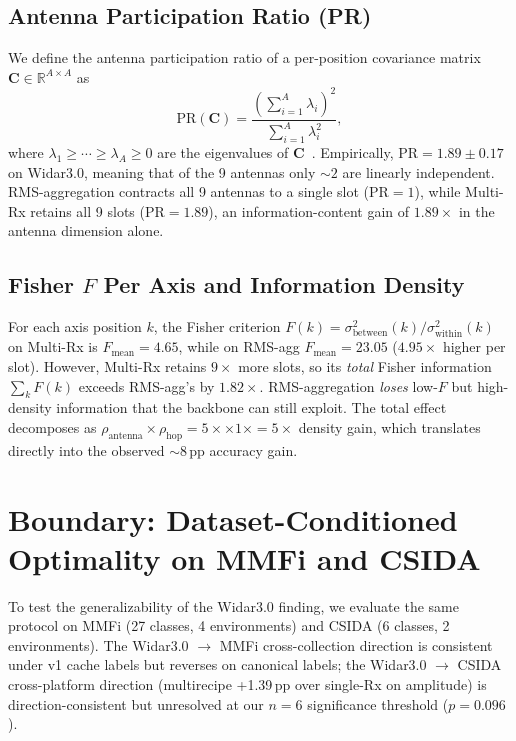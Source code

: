 \documentclass[journal,11pt]{IEEEtran}
\newcommand{\MultiRx}{Multi-Rx}
\newcommand{\PR}{\text{PR}}
\begin{document}
\subsection{Antenna Participation Ratio (PR)}
We define the antenna participation ratio of a per-position covariance matrix $\mathbf{C} \in \mathbb{R}^{A \times A}$ as
\begin{equation}
\PR(\mathbf{C}) = \frac{\left(\sum_{i=1}^{A} \lambda_i\right)^2}{\sum_{i=1}^{A} \lambda_i^2},
\label{eq:pr}
\end{equation}
where $\lambda_1 \geq \cdots \geq \lambda_A \geq 0$ are the eigenvalues of $\mathbf{C}$~\cite{roy2007}. Empirically, $\PR = 1.89 \pm 0.17$ on Widar3.0, meaning that of the 9 antennas only $\sim 2$ are linearly independent. RMS-aggregation contracts all 9 antennas to a single slot ($\PR = 1$), while \MultiRx{} retains all 9 slots ($\PR = 1.89$), an information-content gain of $1.89 \times$ in the antenna dimension alone.

\subsection{Fisher $F$ Per Axis and Information Density}
For each axis position $k$, the Fisher criterion $F(k) = \sigma^2_{\text{between}}(k) / \sigma^2_{\text{within}}(k)$ on Multi-Rx is $F_{\text{mean}} = 4.65$, while on RMS-agg $F_{\text{mean}} = 23.05$ ($4.95\times$ higher per slot). However, Multi-Rx retains $9\times$ more slots, so its \emph{total} Fisher information $\sum_k F(k)$ exceeds RMS-agg's by $1.82 \times$. RMS-aggregation \emph{loses} low-$F$ but high-density information that the backbone can still exploit. The total effect decomposes as $\rho_{\text{antenna}} \times \rho_{\text{hop}} = 5\times \times 1\times = 5\times$ density gain, which translates directly into the observed $\sim$8\,pp accuracy gain.

\section{Boundary: Dataset-Conditioned Optimality on MMFi and CSIDA}
\label{sec:boundary}

To test the generalizability of the Widar3.0 finding, we evaluate the same protocol on MMFi (27 classes, 4 environments) and CSIDA (6 classes, 2 environments). The Widar3.0 $\to$ MMFi cross-collection direction is consistent under v1 cache labels but reverses on canonical labels; the Widar3.0 $\to$ CSIDA cross-platform direction (multirecipe +1.39\,pp over single-Rx on amplitude) is direction-consistent but unresolved at our $n = 6$ significance threshold ($p = 0.096$).
\end{document}
